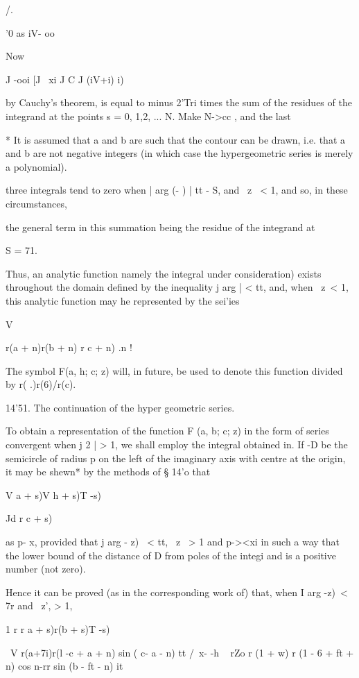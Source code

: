 /.

'0 as iV- oo

Now

J -ooi [J ~xi J C J (iV+i) i)

by Cauchy's theorem, is equal to minus 2'Tri times the sum of the
residues of the integrand at the points s = 0, 1,2, ... N. Make N->cc
, and the last

* It is assumed that a and b are such that the contour can be drawn,
i.e. that a and b are not negative integers (in which case the
hypergeometric series is merely a polynomial).

%
%

three integrals tend to zero when | arg (- ) | tt - S, and \ z \ < 1,
and so, in these circumstances,

the general term in this summation being the residue of the integrand
at

S = 71.

Thus, an analytic function namely the integral under consideration)
exists throughout the domain defined by the inequality j arg | < tt,
and, when \ z\ < 1, this analytic function may he represented by the
sei'ies

V

r(a + n)r(b + n) r c + n) .n !

The symbol F(a, h; c; z) will, in future, be used to denote this
function divided by r( .)r(6)/r(c).

14'51. The continuation of the hyper geometric series.

To obtain a representation of the function F (a, b; c; z) in the form
of series convergent when j 2 | > 1, we shall employ the integral
obtained in. If -D be the semicircle of radius p on the left of
the imaginary axis with centre at the origin, it may be shewn* by the
methods of § 14'o that

V a + s)V h + s)T -s)

Jd r c + s)

as p- x, provided that j arg - z) \ < tt, \ z \ > 1 and p-><xi in
such a way that the lower bound of the distance of D from poles of the
integi and is a positive number (not zero).

Hence it can be proved (as in the corresponding work of) that,
when I arg -z)\ < 7r and \ z', > 1,

1 r r a + s)r(b + s)T -s)

\ V r(a+7i)r(l -c + a + n) sin ( c- a - n) tt /\ x- -h ~ rZo r (1 + w)
r (1 - 6 + ft + n) cos n-rr sin (b - ft - n) it

